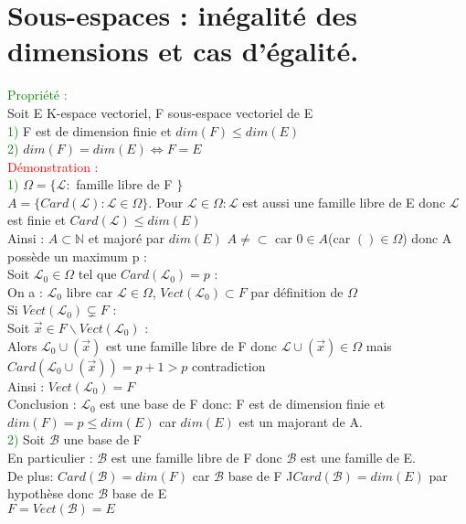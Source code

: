 \documentclass{article}
\begin{document}
\section{Sous-espaces : inégalité des dimensions et cas d'égalité. }
\textcolor{green}{Propriété :} \\
Soit E K-espace vectoriel, F sous-espace vectoriel de E \\
\textcolor{green}{1)} F est de dimension finie et $dim(F) \leq dim(E)$ \\
\textcolor{green}{2)} $dim(F)=dim(E) \Longleftrightarrow F=E$ \\
\textcolor{red}{Démonstration :} \\
\textcolor{green}{1)} $\Omega=\lbrace \mathcal L :$ famille libre de F $\rbrace$ \\
$A=\lbrace Card(\mathcal L) : \mathcal L \in \Omega \rbrace$. Pour $\mathcal L \in \Omega  : \mathcal L$ est aussi une famille libre de E donc $\mathcal L$ est finie et $Card(\mathcal L) \leq dim(E)$ \\
Ainsi : $A \subset \mathbb N$ et majoré par $dim(E)$ $A \neq \subset$  car $0 \in A$(car $()\in \Omega$) donc A possède un maximum p : \\
Soit $\mathcal L_0 \in \Omega$ tel que $Card(\mathcal L_0) = p $ : \\
On a : $\mathcal L_0$ libre car $\mathcal L \in \Omega$, $Vect(\mathcal L_0) \subset F$ par définition de $ \Omega $ \\
Si $Vect(\mathcal L_0) \subsetneq F$ : \\
Soit $\vec x \in  F \backslash Vect (\mathcal L_0)$ : \\
Alors $\mathcal L_0 \cup (\vec x)$ est une famille libre de F donc $\mathcal L \cup (\vec x) \in \Omega$ mais $Card(\mathcal L_0 \cup (\vec x))=p+1>p$ contradiction \\
Ainsi : $Vect(\mathcal L_0)=F$ \\
Conclusion : $\mathcal L_0$ est une base de F donc: F est de dimension finie et $dim(F)=p \leq dim(E)$ car $dim(E)$ est un majorant de A. \\
\textcolor{green}{2)} Soit $ \mathcal B$ une base de F \\
En particulier : $ \mathcal B$ est une famille libre de F donc $ \mathcal B$ est une famille de E. \\
De plus: $Card(\mathcal B)=dim(F)$ car $\mathcal B$ base de F ^^
$Card(\mathcal B)=dim(E)$ par hypothèse donc $\mathcal B$ base de E \\
$F=Vect(\mathcal B)=E$ \\
\end{document}
